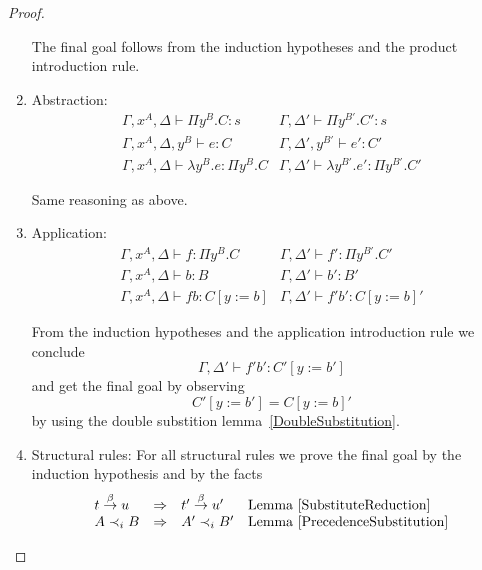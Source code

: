 \begin{theorem}
\begin{proof}
\begin{enumerate}
                The final goal follows from the induction hypotheses and the
                product introduction rule.

            \item Abstraction:
                $$
                \begin{array}{l|l}
                    \Gamma, x^A, \Delta \vdash \Pi y^B. C: s
                    &
                    \Gamma, \Delta' \vdash \Pi y^{B'}. C': s
                    \\
                    \Gamma, x^A, \Delta, y^B \vdash e: C
                    &
                    \Gamma, \Delta', y^{B'} \vdash e': C'
                    \\
                    \hline
                    \Gamma, x^A, \Delta \vdash \lambda y^B. e: \Pi y^B. C
                    &
                    \Gamma, \Delta' \vdash \lambda y^{B'}. e' : \Pi y^{B'}. C'
                \end{array}
                $$

                Same reasoning as above.

            \item Application:
                $$
                \begin{array}{l|l}
                    \Gamma, x^A, \Delta \vdash f: \Pi y^B. C
                    &
                    \Gamma, \Delta' \vdash f' : \Pi y^{B'}. C'
                    \\
                    \Gamma, x^A, \Delta \vdash b: B
                    &
                    \Gamma, \Delta' \vdash b': B'
                    \\
                    \hline
                    \Gamma, x^A, \Delta \vdash f b: C[y:=b]
                    &
                    \Gamma, \Delta' \vdash f' b': C[y:=b]'
                \end{array}
                $$

                From the induction hypotheses and the application introduction
                rule we conclude
                $$
                    \Gamma, \Delta' \vdash f' b': C'[y:=b']
                $$
                and get the final goal by observing
                $$
                    C'[y:=b'] = C[y:=b]'
                $$
                by using the double substition lemma~\ref{DoubleSubstitution}.

            \item Structural rules: For all structural rules we prove the final
                goal by the induction hypothesis and by the facts
                $$
                \begin{array}{llll}
                    t \stackrel{\beta}{\to} u     &\Rightarrow& t' \stackrel{\beta}{\to} u'
                    &\text{Lemma~\ref{SubstituteReduction}}
                    \\
                    A \prec_i B     &\Rightarrow& A' \prec_i B'
                    &\text{Lemma~\ref{PrecedenceSubstitution}}
                \end{array}
                $$


\end{enumerate}
\end{proof}
\end{theorem}
